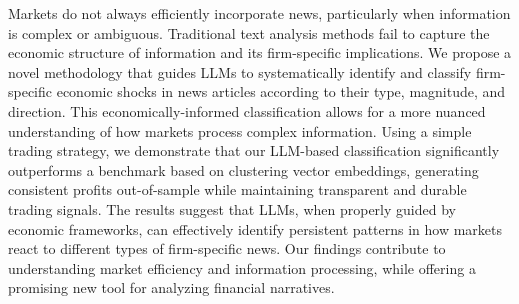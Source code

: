 Markets do not always efficiently incorporate news, particularly when information is complex or ambiguous. Traditional text analysis methods fail to capture the economic structure of information and its firm-specific implications. We propose a novel methodology that guides LLMs to systematically identify and classify firm-specific economic shocks in news articles according to their type, magnitude, and direction. This economically-informed classification allows for a more nuanced understanding of how markets process complex information. Using a simple trading strategy, we demonstrate that our LLM-based classification significantly outperforms a benchmark based on clustering vector embeddings, generating consistent profits out-of-sample while maintaining transparent and durable trading signals. The results suggest that LLMs, when properly guided by economic frameworks, can effectively identify persistent patterns in how markets react to different types of firm-specific news. Our findings contribute to understanding market efficiency and information processing, while offering a promising new tool for analyzing financial narratives.







